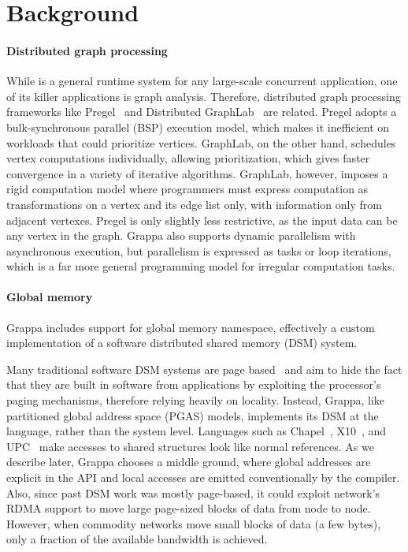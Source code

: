 \section{Background}



\paragraph{Distributed graph processing} While \Grappa is a general runtime
system for any large-scale concurrent application, one of its killer
applications is graph analysis. Therefore, distributed graph processing
frameworks like Pregel~\cite{pregel:2010} and Distributed
GraphLab~\cite{distgraphlab:vldb12} are related. Pregel adopts a
bulk-synchronous parallel (BSP) execution model, which makes it inefficient on
workloads that could prioritize vertices. GraphLab, on the other hand,
schedules vertex computations individually, allowing prioritization, which
gives faster convergence in a variety of iterative algorithms. GraphLab,
however, imposes a rigid computation model where programmers must express
computation as transformations on a vertex and its edge list only, with
information only from adjacent vertexes. Pregel is only slightly less
restrictive, as the input data can be any vertex in the graph. Grappa also
supports dynamic parallelism with asynchronous execution, but parallelism is
expressed as tasks or loop iterations, which is a far more general programming
model for irregular computation tasks.

\paragraph{Global memory} Grappa includes support for global memory namespace,
effectively a custom implementation of a software distributed shared memory
(DSM) system. 

Many traditional software DSM systems are page based~\cite{Treadmarks,munin}
and aim to hide the fact that they are built in software from applications by
exploiting the processor's paging mechanisms, therefore relying heavily on
locality. Instead, Grappa, like partitioned global address space (PGAS)
models, implements its DSM at the language, rather than the system level.
Languages such as Chapel~\cite{Chamberlain:2007}, X10~\cite{X10:2005}, and
UPC~\cite{upc:2005} make accesses to shared structures look like normal
references. As we describe later, Grappa chooses a middle ground, where global
addresses are explicit in the API and local accesses are emitted
conventionally by the compiler. Also, since past DSM work was mostly
page-based, it could exploit network's RDMA support to move large page-sized
blocks of data from node to node. However, when commodity networks move small
blocks of data (a few bytes), only a fraction of the available bandwidth is
achieved. 

